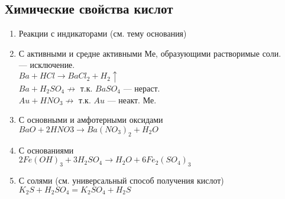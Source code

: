 \subsection{Химические свойства кислот}
\begin{enumerate}
    \item Реакции с индикаторами (см. тему основания)

    \item С активными и средне активными Ме, образующими растворимые соли.\\
         --- исключение.\\
        $Ba + HCl \rightarrow BaCl_2 + H_2\uparrow$\\
        $Ba + H_2SO_4 \not \rightarrow$ т.к. $BaSO_4$ --- нераст.\\
        $Au + HNO_3 \not \rightarrow$ т.к. $Au$ --- неакт. Ме.

    \item С основными и амфотерными оксидами\\
        $BaO + 2HNO3 \rightarrow Ba(NO_3)_2 + H_2O$

    \item С основаниями\\
        $2Fe(OH)_3 + 3H_2SO_4 \rightarrow H_2O + 6Fe_2(SO_4)_3$

    \item С солями (см. универсальный способ получения кислот)\\
        $K_2S + H_2SO_4 = K_2SO_4 + H_2S$

\end{enumerate}
